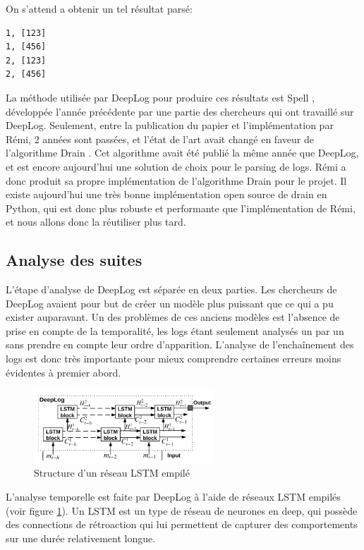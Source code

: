 \documentclass[openany, 12pt]{memoir}
\begin{document}
On s'attend a obtenir un tel résultat parsé:

\begin{lstlisting}
1, [123]
1, [456]
2, [123]
2, [456]
\end{lstlisting}

La méthode utilisée par DeepLog pour produire ces résultats est Spell \cite{spell}, développée l'année précédente par une partie des chercheurs qui ont travaillé sur DeepLog. Seulement, entre la publication du papier et l'implémentation par Rémi, 2 années sont passées, et l'état de l'art avait changé en faveur de l'algorithme Drain \cite{drain}. Cet algorithme avait été publié la même année que DeepLog, et est encore aujourd'hui une solution de choix pour le parsing de \glspl{log}. Rémi a donc produit sa propre implémentation de l'algorithme Drain pour le projet. Il existe aujourd'hui une très bonne implémentation open source de drain en Python, qui est donc plus robuste et performante que l'implémentation de Rémi, et nous allons donc la réutiliser plus tard.

\subsection{Analyse des suites}

L'étape d'analyse de DeepLog est séparée en deux parties. Les chercheurs de DeepLog avaient pour but de créer un modèle plus puissant que ce qui a pu exister auparavant. Un des problèmes de ces anciens modèles est l'absence de prise en compte de la temporalité, les \glspl{log} étant seulement analysés un par un sans prendre en compte leur ordre d'apparition. L'analyse de l'enchaînement des \glspl{log} est donc très importante pour mieux comprendre certaines erreurs moins évidentes à premier abord.

\begin{figure}[ht]
	\centering
	\includegraphics[width=0.6\textwidth]{images/stacked_lstm.png}
	\caption{Structure d'un réseau \gls{LSTM} empilé}
	\label{lstm}
\end{figure}

L'analyse temporelle est faite par DeepLog à l'aide de réseaux \gls{LSTM} empilés (voir figure \ref{lstm}). Un \gls{LSTM} est un type de réseau de neurones en \gls{deep}, qui possède des connections de rétroaction qui lui permettent de capturer des comportements sur une durée relativement longue.
\end{document}
